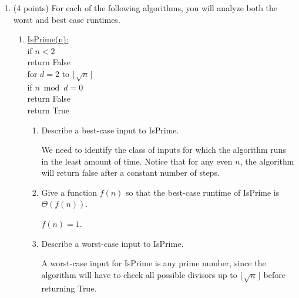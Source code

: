 \documentclass[11pt]{article}
\begin{document}
\begin{enumerate}
\item (4 points) For each of the following algorithms, you will analyze both the worst and best case runtimes.
\begin{enumerate}
    \item
    \begin{algo}
        \underline{IsPrime(n):}\\
        \> if $n < 2$\\
        \> \> return False\\
        \> for $d = 2$ to $\lfloor \sqrt{n} \rfloor$\\
        \> \> if $n \bmod d = 0$\\
        \> \> \> return False\\
        \> return True
    \end{algo}
    \begin{enumerate}
        \item Describe a best-case input to IsPrime.
    \begin{Solution}
        We need to identify the class of inputs for which the algorithm runs in the least amount of time.
        Notice that for any even $n$, the algorithm will return false after a constant number of steps.
    \end{Solution}
        \item Give a function $f(n)$ so that the best-case runtime of IsPrime is $\Theta(f(n))$.
    \begin{Solution}
        $f(n) = 1$.
    
    \end{Solution}
        \item Describe a worst-case input to IsPrime.
    \begin{Solution}
        A worst-case input for IsPrime is any prime number, since the algorithm
        will have to check all possible divisors up to $\lfloor \sqrt{n}
        \rfloor$ before returning True.
    

\end{Solution}
\end{enumerate}
\end{enumerate}
\end{enumerate}
\end{document}
